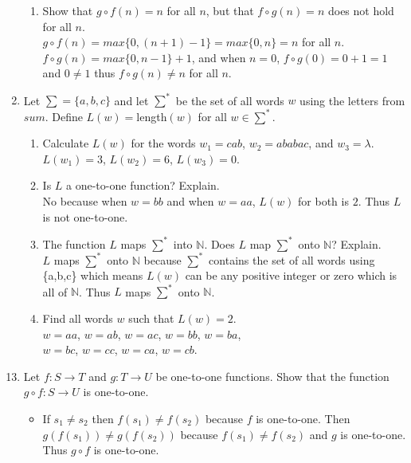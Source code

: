 \documentclass{article}
\newcommand{\N}{\mathbb{N}}
\begin{document}
\begin{enumerate}
\begin{enumerate}
	\item Show that $g\circ f(n)=n$ for all $n$, but that $f\circ g(n)=n$ does not hold for all $n$.\\
	$g\circ f(n) = max\{0,(n+1)-1\} = max\{0,n\} = n$ for all $n$.\\
	$f\circ g(n) = max\{0,n-1\} + 1$, and when $n=0$, $f\circ g(0)=0+1=1$ and $0\not=1$ thus 
	$f\circ g(n)\not=n$ for all $n$.
	\end{enumerate}
\item Let $\sum =\{a,b,c\}$ and let $\sum^\ast$ be the set of all words $w$ using the letters from $sum$. Define $L(w)=$length$(w)$ for all $w \in \sum^\ast$.
	\begin{enumerate}
	\item Calculate $L(w)$ for the words $w_1=cab$, $w_2=ababac$, and $w_3=\lambda$.\\
	$L(w_1)=3$, $L(w_2)=6$, $L(w_3)=0$.
	\item Is $L$ a one-to-one function? Explain.\\
	No because when $w=bb$ and when $w=aa$, $L(w)$ for both is $2$. Thus $L$ is not one-to-one.
	\item The function $L$ maps $\sum^\ast$ into $\N$. Does $L$ map $\sum^\ast$ onto $\N$? Explain.\\
	$L$ maps $\sum^\ast$ onto $\N$ because $\sum^\ast$ contains the set of all words using \{a,b,c\} 
	which means $L(w)$ can be any positive integer or zero which is all of $\N$. Thus $L$ maps 
	$\sum^\ast$ onto $\N$.
	\item Find all words $w$ such that $L(w)=2$.\\
	$w=aa$, $w=ab$, $w=ac$, $w=bb$, $w=ba$,\\$w=bc$, $w=cc$, $w=ca$, $w=cb$.
	\end{enumerate}
\end{enumerate}
\begin{enumerate}
\setcounter{enumi}{12}
\item Let $f : S\to T$ and $g: T\to U$ be one-to-one functions. Show that the function $g\circ f: S\to U$ is one-to-one.
	\begin{itemize}
	\item If $s_1\not=s_2$ then $f(s_1)\not=f(s_2)$ because $f$ is one-to-one. Then $g(f(s_1))\not=
	g(f(s_2))$ because $f(s_1)\not=f(s_2)$ and $g$ is one-to-one. Thus $g\circ f$ is one-to-one.
	\end{itemize}
\end{enumerate}
\end{document}
